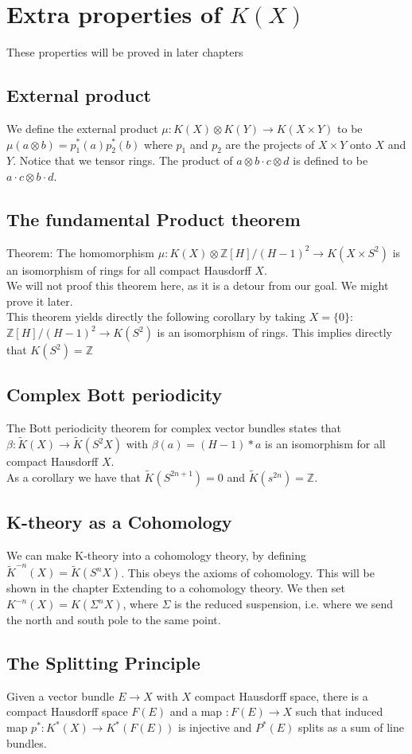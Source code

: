 \documentclass[../Thesis.tex]{subfiles}
\begin{document}
\section{Extra properties of $K(X)$}
These properties will be proved in later chapters
\subsection{External product}
We define the external product $\mu : K(X) \otimes K(Y) \rightarrow K(X \times Y)$ to be $\mu( a \otimes b) = p_1^*(a) p_2^*(b)$ where $p_1$ and $p_2$ are the projects of $X \times Y$ onto $X$ and $Y$. Notice that we tensor rings. The product of $a \otimes b \cdot c \otimes d$ is defined to be $ a \cdot c \otimes b \cdot d$.
\subsection{The fundamental Product theorem}
Theorem: The homomorphism $\mu:K(X) \otimes \mathbb{Z}[H]/(H-1)^2 \rightarrow K(X \times S^2)$ is an isomorphism of rings for all compact Hausdorff $X$.
\\We will not proof this theorem here, as it is a detour from our goal. We might prove it later.
\\This theorem yields directly the following corollary by taking $X = \{0\}$:
\\$\mathbb{Z}[H]/(H-1)^2 \rightarrow K(S^2)$ is an isomorphism of rings. This implies directly that $K(S^2) = \mathbb{Z}$
\subsection{Complex Bott periodicity}
The Bott periodicity theorem for complex vector bundles states that $\beta: \tilde{K}(X) \rightarrow \tilde{K}(S^2 X)$ with $\beta(a) = (H-1) * a$ is an isomorphism for all compact Hausdorff $X$.
\\As a corollary we have that $\tilde{K}(S^{2n + 1}) = 0$ and $\tilde{K}(s^{2n}) = \mathbb{Z}$.
\subsection{K-theory as a Cohomology}
We can make K-theory into a cohomology theory, by defining $\tilde{K}^{-n} (X) = \tilde{K}(S^n X)$. This obeys the axioms of cohomology. This will be shown in the chapter Extending to a cohomology theory. We then set $K^{-n}(X) = K(\Sigma^n X)$, where $\Sigma$ is the reduced suspension, i.e. where we send the north and south pole to the same point.
\subsection{The Splitting Principle}
Given a vector bundle $E \rightarrow X$ with $X$ compact Hausdorff space, there is a compact Hausdorff space $F(E)$ and a map $: F(E) \rightarrow X$ such that induced map $p^* : K^*(X)  \rightarrow K^*(F(E))$ is injective and $P^*(E)$ splits as a sum of line bundles.
\end{document}
